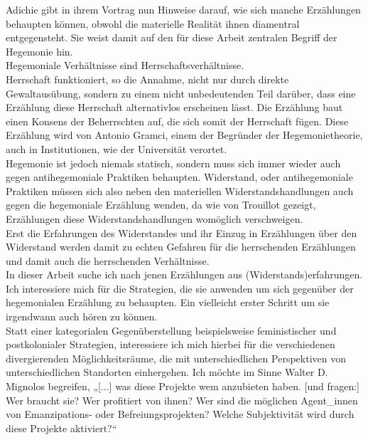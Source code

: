 Adichie gibt in ihrem Vortrag nun Hinweise darauf, wie sich manche
Erzählungen behaupten können, obwohl die materielle Realität ihnen diamentral
entgegensteht. Sie weist damit auf den für diese Arbeit zentralen Begriff der
Hegemonie hin.\\
Hegemoniale Verhältnisse sind
Herrschaftsverhältnisse.\footnotemark{}\\
Herrschaft
funktioniert, so die Annahme, nicht nur durch direkte Gewaltausübung, sondern
zu einem nicht unbedeutenden Teil darüber, dass eine Erzählung diese Herrschaft
alternativlos erscheinen lässt. Die Erzählung baut einen Konsens der
Beherrschten auf, die sich somit der Herrschaft fügen. Diese Erzählung wird von
Antonio Gramci, einem der Begründer der Hegemonietheorie, auch in
Institutionen, wie der Universität verortet.\footnotemark{}\\
Hegemonie ist jedoch niemals statisch, sondern muss sich immer wieder auch
gegen antihegemoniale Praktiken behaupten. Widerstand, oder antihegemoniale
Praktiken müssen sich also neben den materiellen Widerstandshandlungen auch
gegen die hegemoniale Erzählung wenden, da wie von Trouillot gezeigt,
Erzählungen diese Widerstandshandlungen womöglich verschweigen.\\
Erst die
Erfahrungen des Widerstandes und ihr Einzug in Erzählungen über den Widerstand
werden damit zu echten Gefahren für die herrschenden Erzählungen und damit auch
die herrschenden Verhältnisse.\\


\noindent In dieser Arbeit suche ich nach jenen Erzählungen aus (Widerstands)erfahrungen. Ich interessiere mich für die Strategien, die sie anwenden um sich gegenüber der hegemonialen Erzählung zu behaupten. Ein vielleicht erster Schritt um sie irgendwann auch hören zu können.\\  
Statt einer kategorialen Gegenüberstellung
beispielsweise feministischer und postkolonialer Strategien, interessiere ich mich hierbei
für die verschiedenen divergierenden Möglichkeitsräume, die mit
unterschiedlichen Perspektiven von unterschiedlichen Standorten einhergehen.
Ich möchte im Sinne Walter D. Mignolos begreifen, „[...] was diese Projekte wem
anzubieten haben. [und fragen:] Wer braucht sie? Wer profitiert von ihnen? Wer
sind die möglichen Agent\_innen von Emanzipations- oder Befreiungsprojekten?
Welche Subjektivität wird durch diese Projekte
aktiviert?“\footnotemark{}\\

